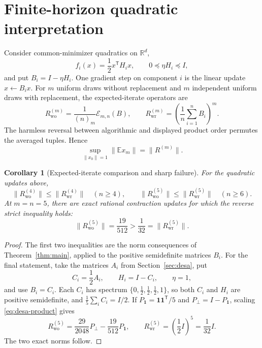\documentclass[11pt]{article}
\newtheorem{corollary}[theorem]{Corollary}
\newcommand{\E}{\mathcal E}
\newcommand{\fall}[2]{(#1)_{#2}}
\newcommand{\one}{\mathbf 1}
\begin{document}
\section{Finite-horizon quadratic interpretation}\label{sec:optimization}

Consider common-minimizer quadratics on \(\mathbb R^d\),
\[
 f_i(x)=\frac12x^{\mathsf T}H_ix,\qquad
 0\preceq\eta H_i\preceq I,
\]
and put \(B_i=I-\eta H_i\).  One gradient step on component \(i\) is the
linear update \(x\leftarrow B_ix\).  For \(m\) uniform draws without
replacement and \(m\) independent uniform draws with replacement, the
expected-iterate operators are
\begin{equation}\label{eq:update-operators}
 R_{\mathrm{wo}}^{(m)}
 =\frac1{\fall nm}\E_{m,n}(B),
 \qquad
 R_{\mathrm{wr}}^{(m)}
 =\left(\frac1n\sum_{i=1}^{n}B_i\right)^m.
\end{equation}
The harmless reversal between algorithmic and displayed product order
permutes the averaged tuples.  Hence
\[
 \sup_{\|x_0\|=1}\|\mathbb E x_m\|
 =\|R^{(m)}\|.
\]

\begin{corollary}[Expected-iterate comparison and sharp failure]
\label{cor:quadratic}
For the quadratic updates above,
\[
 \|R_{\mathrm{wo}}^{(4)}\|
 \le\|R_{\mathrm{wr}}^{(4)}\|
 \quad(n\ge4),
\qquad
 \|R_{\mathrm{wo}}^{(5)}\|
 \le\|R_{\mathrm{wr}}^{(5)}\|
 \quad(n\ge6).
\]
At \(m=n=5\), there are exact rational contraction updates for which the
reverse strict inequality holds:
\[
 \|R_{\mathrm{wo}}^{(5)}\|=\frac{19}{512}
 >
 \frac1{32}
 =\|R_{\mathrm{wr}}^{(5)}\|.
\]
\end{corollary}

\begin{proof}
The first two inequalities are the norm consequences of
Theorem~\ref{thm:main}, applied to the positive semidefinite matrices \(B_i\).
For the final statement, take the matrices \(A_i\) from
Section~\ref{sec:desa}, put
\[
 C_i=\frac12A_i,\qquad H_i=I-C_i,\qquad \eta=1,
\]
and use \(B_i=C_i\).  Each \(C_i\) has spectrum
\(\{0,\frac12,\frac12,\frac12,1\}\), so both \(C_i\) and \(H_i\) are positive
semidefinite, and \(\frac15\sum_iC_i=I/2\).  If
\(P_{\one}=\one\one^{\mathsf T}/5\) and \(P_{\perp}=I-P_{\one}\), scaling
\eqref{eq:desa-product} gives
\[
 R_{\mathrm{wo}}^{(5)}
 =\frac{29}{2048}P_{\perp}-\frac{19}{512}P_{\one},
 \qquad
 R_{\mathrm{wr}}^{(5)}=\left(\frac12I\right)^5=\frac1{32}I.
\]
The two exact norms follow.
\end{proof}
\end{document}

